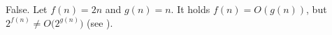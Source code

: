 False.
Let $f(n)=2n$ and $g(n)=n$.
It holds $f(n)=O(g(n))$, but $2^{f(n)}\ne O\bigl(2^{g(n)}\bigr)$ (see ).
